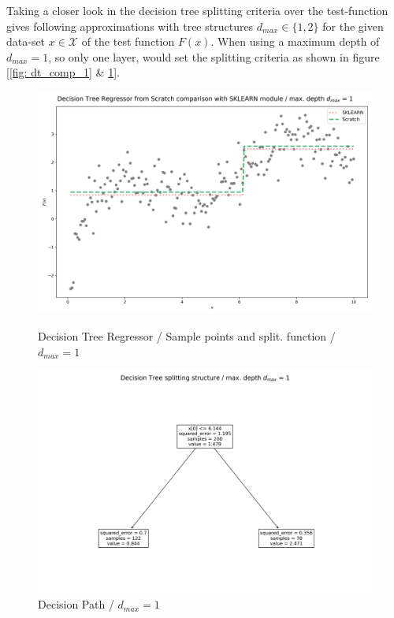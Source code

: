 \documentclass[12pt, a4paper]{article}
\begin{document}
Taking a closer look in the decision tree splitting criteria over the test-function gives following approximations with tree structures $d_{max} \in \{1,2\}$ for the given data-set $x \in \mathcal{X}$ of the test function $F(x)$. When using a maximum depth of $d_{max} = 1$, so only one layer, would set the splitting criteria as shown in figure [\ref{fig: dt_comp_1} \& \ref{fig: dt_split_1}].
\begin{figure}[htbp]
\begin{minipage}[t]{8cm}
\vspace{0pt}
\centering
\includegraphics[width=1\textwidth,trim={0 0 0 0},clip]{figures/decision_tree_regressor_comparison_md=1.png}
\caption[Decision Tree Regressor / One Layer]{Decision Tree Regressor / Sample points and split. function / $d_{max} = 1$}
\label{fig: dt_comp_1}
\end{minipage}
\hfill
\begin{minipage}[t]{8cm}
\vspace{0pt}
\centering
\includegraphics[width=1\textwidth,trim={0 0 0 0},clip]{figures/decision_tree_splitting_structure_md=1.png}
\caption[Decision Path / One Layer]{Decision Path / $d_{max} = 1$}
\label{fig: dt_split_1}
\end{minipage}
\end{figure}
\end{document}
